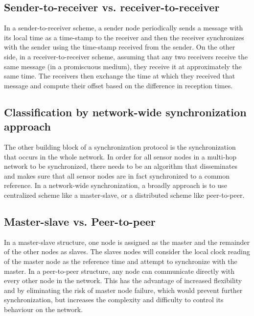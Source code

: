 \setcounter{secnumdepth}{0}
\subsection{Sender-to-receiver vs. receiver-to-receiver}
In a sender-to-receiver scheme, a sender node periodically sends a message with its local time as a time-stamp to the receiver and then the receiver synchronizes with the sender using the time-stamp received from the sender. On the other side, in a receiver-to-receiver scheme, assuming that any two receivers receive the same message (in a promiscuous medium), they receive it at approximately the same time. The receivers then exchange the time at which they received that message and compute their offset based on the difference in reception times.

\setcounter{secnumdepth}{3}
\subsection{Classification by network-wide synchronization approach}
The other building block of a synchronization protocol is the synchronization that occurs in the whole network. In order for all sensor nodes in a multi-hop network to be synchronized, there needs to be an algorithm that disseminates and makes sure
that all sensor nodes are in fact synchronized to a common reference. In a network-wide synchronization, a broadly approach is to use centralized scheme like a master-slave, or a distributed scheme like peer-to-peer.

\setcounter{secnumdepth}{0}
\subsection{Master-slave vs. Peer-to-peer}
In a master-slave structure, one node is assigned as the master and the remainder of the other nodes as slaves. The slaves nodes will consider the local clock reading of the master node as the reference time and attempt to synchronize with the master. In a peer-to-peer structure, any node can communicate directly with every other node in the network. This has the advantage of increased flexibility and by eliminating the risk of master node failure, which would prevent further synchronization, but increases the complexity and difficulty to control its behaviour on the network.

